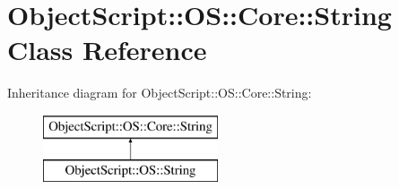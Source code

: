 \hypertarget{class_object_script_1_1_o_s_1_1_core_1_1_string}{}\section{Object\+Script\+:\+:OS\+:\+:Core\+:\+:String Class Reference}
\label{class_object_script_1_1_o_s_1_1_core_1_1_string}
Inheritance diagram for Object\+Script\+:\+:OS\+:\+:Core\+:\+:String\+:\begin{figure}[H]
\begin{center}
\leavevmode
\includegraphics[height=2.000000cm]{class_object_script_1_1_o_s_1_1_core_1_1_string}
\end{center}
\end{figure}
